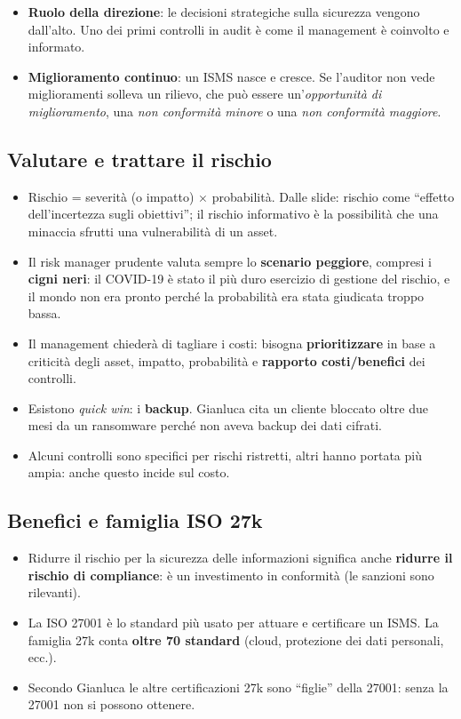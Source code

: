 \begin{itemize}
  \item \textbf{Ruolo della direzione}: le decisioni strategiche sulla sicurezza vengono dall'alto.
    Uno dei primi controlli in audit è come il management è coinvolto e informato.
  \item \textbf{Miglioramento continuo}: un ISMS nasce e cresce. Se l'auditor non vede miglioramenti
    solleva un rilievo, che può essere un'\emph{opportunità di miglioramento}, una \emph{non
    conformità minore} o una \emph{non conformità maggiore}.
\end{itemize}

\subsection{Valutare e trattare il rischio}
\begin{itemize}
  \item Rischio = severità (o impatto) $\times$ probabilità. Dalle slide: rischio come ``effetto
    dell'incertezza sugli obiettivi''; il rischio informativo è la possibilità che una minaccia sfrutti
    una vulnerabilità di un asset.
  \item Il risk manager prudente valuta sempre lo \textbf{scenario peggiore}, compresi i
    \textbf{cigni neri}: il COVID-19 è stato il più duro esercizio di gestione del rischio, e il
    mondo non era pronto perché la probabilità era stata giudicata troppo bassa.
  \item Il management chiederà di tagliare i costi: bisogna \textbf{prioritizzare} in base a
    criticità degli asset, impatto, probabilità e \textbf{rapporto costi/benefici} dei controlli.
  \item Esistono \emph{quick win}: i \textbf{backup}. Gianluca cita un cliente bloccato oltre due mesi
    da un ransomware perché non aveva backup dei dati cifrati.
  \item Alcuni controlli sono specifici per rischi ristretti, altri hanno portata più ampia: anche
    questo incide sul costo.
\end{itemize}

\subsection{Benefici e famiglia ISO 27k}
\begin{itemize}
  \item Ridurre il rischio per la sicurezza delle informazioni significa anche \textbf{ridurre il
    rischio di compliance}: è un investimento in conformità (le sanzioni sono rilevanti).
  \item La ISO 27001 è lo standard più usato per attuare e certificare un ISMS. La famiglia 27k conta
    \textbf{oltre 70 standard} (cloud, protezione dei dati personali, ecc.).
  \item Secondo Gianluca le altre certificazioni 27k sono ``figlie'' della 27001: senza la 27001 non
    si possono ottenere.
\end{itemize}

